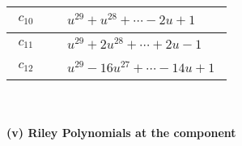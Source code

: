 \documentclass[1p]{elsarticle_modified}
\theoremstyle{definition}
\begin{document}
\begin{tabular}{m{50pt}|m{274pt}}
\hline $$\begin{aligned}c_{10}\end{aligned}$$&$\begin{aligned}
&u^{29}+u^{28}+\cdots-2 u+1
\end{aligned}$\\
\hline $$\begin{aligned}c_{11}\end{aligned}$$&$\begin{aligned}
&u^{29}+2 u^{28}+\cdots+2 u-1
\end{aligned}$\\
\hline $$\begin{aligned}c_{12}\end{aligned}$$&$\begin{aligned}
&u^{29}-16 u^{27}+\cdots-14 u+1
\end{aligned}$\\
\hline
\end{tabular}\\~\\
\newpage\renewcommand{\arraystretch}{1}
\flushleft \textbf{(v) Riley Polynomials at the component}\newline \\
\end{document}
